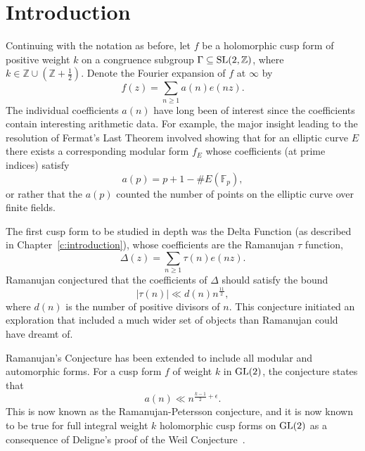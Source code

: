 

\section{Introduction}


Continuing with the notation as before, let $f$ be a holomorphic cusp form of positive
weight $k$ on a congruence subgroup $\Gamma \subseteq \operatorname{SL}(2, \mathbb{Z})$, where $k \in
\mathbb{Z} \cup ( \mathbb{Z} + \tfrac{1}{2})$.
Denote the Fourier expansion of $f$ at $\infty$ by
\begin{equation}
  f(z) = \sum_{n \geq 1} a(n) e(nz).
\end{equation}
The individual coefficients $a(n)$ have long been of interest since the coefficients
contain interesting arithmetic data.
For example, the major insight leading to the resolution of Fermat's Last Theorem involved
showing that for an elliptic curve $E$ there exists a corresponding modular form $f_E$
whose coefficients (at prime indices) satisfy
\begin{equation}
  a(p) = p + 1 - \# E(\mathbb{F}_p),
\end{equation}
or rather that the $a(p)$ counted the number of points on the elliptic curve over finite
fields.


The first cusp form to be studied in depth was the Delta Function (as described in
Chapter~\ref{c:introduction}), whose coefficients are the Ramanujan $\tau$ function,
\begin{equation}
  \Delta(z) = \sum_{n \geq 1} \tau(n) e(nz).
\end{equation}
Ramanujan conjectured that the coefficients of $\Delta$ should satisfy the bound
\begin{equation}
  \lvert \tau(n) \rvert \ll d(n) n^{\frac{11}{2}},
\end{equation}
where $d(n)$ is the number of positive divisors of $n$.
This conjecture initiated an exploration that included a much wider set of objects than
Ramanujan could have dreamt of.



Ramanujan's Conjecture has been extended to include all modular and automorphic forms.
For a cusp form $f$ of weight $k$ in $\operatorname{GL}(2)$, the conjecture states that
\begin{equation}\label{eq:ramanujan_conjecture_an}
  a(n) \ll n^{\frac{k-1}{2} + \epsilon}.
\end{equation}
This is now known as the Ramanujan-Petersson conjecture, and it is now known to be true
for full integral weight $k$ holomorphic cusp forms on $\operatorname{GL}(2)$ as a consequence of
Deligne's proof of the Weil Conjecture~\cite{Deligne}.


